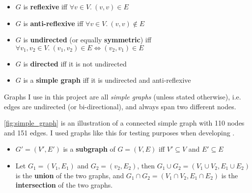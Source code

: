 \begin{definition}
    \begin{itemize}[leftmargin=*]
        \item $G$ is \textbf{reflexive} iff $\forall v \in V.\ (v, v) \in E$
        \item $G$ is \textbf{anti-reflexive} iff $\forall v \in V.\ (v, v) \notin E$
        \item $G$ is \textbf{undirected} (or equally \textbf{symmetric}) iff $\forall v_1, v_2 \in V.\ (v_1, v_2) \in E \Leftrightarrow (v_2, v_1) \in E$
        \item $G$ is \textbf{directed} iff it is not undirected
        \item $G$ is a \textbf{simple graph} iff it is undirected and anti-reflexive
    \end{itemize}
\end{definition}

Graphs I use in this project are all \textsl{simple graphs} (unless stated otherwise), i.e. edges are undirected (or bi-directional), and always span two different nodes.



\autoref{fig:simple_graph} is an illustration of a connected simple graph with 110 nodes and 151 edges.
I used graphs like this for testing purposes when developing \graffs.

\begin{definition}
    \begin{itemize}[leftmargin=*]
        \item $G' = (V', E')$ is a \textbf{subgraph} of $G = (V, E)$ iff $V' \subseteq V$ and $E' \subseteq E$
        \item Let $G_1 = (V_1, E_1)$ and $G_2 = (v_2, E_2)$, then $G_1 \cup G_2 = (V_1 \cup V_2, E_1 \cup E_2)$ is the \textbf{union} of the two graphs, and $G_1 \cap G_2 = (V_1 {\cap} V_2, E_1 {\cap} E_2)$ is the \textbf{intersection} of the two graphs.
    \end{itemize}
\end{definition}

